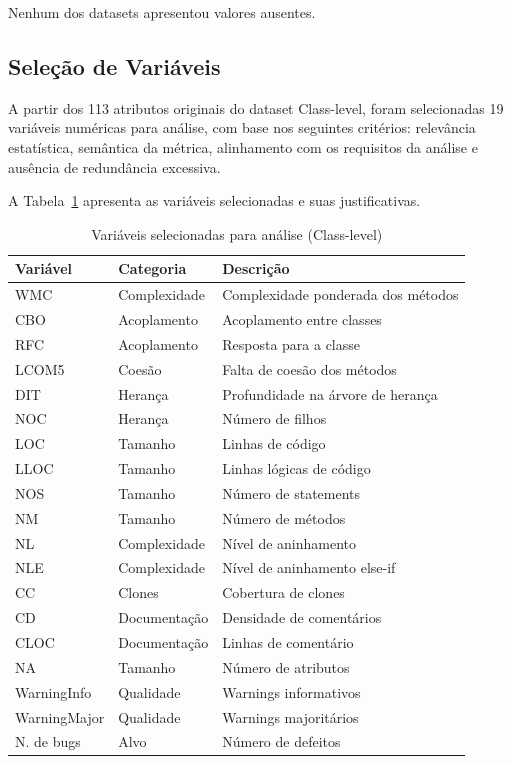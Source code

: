 \documentclass[12pt]{article}
\begin{document}
Nenhum dos datasets apresentou valores ausentes.

\subsection{Seleção de Variáveis}

A partir dos 113 atributos originais do dataset Class-level, foram selecionadas 19 variáveis numéricas para análise, com base nos seguintes critérios: relevância estatística, semântica da métrica, alinhamento com os requisitos da análise e ausência de redundância excessiva.

A Tabela~\ref{tab:selecao} apresenta as variáveis selecionadas e suas justificativas.

\begin{table}[H]
\centering
\caption{Variáveis selecionadas para análise (Class-level)}
\label{tab:selecao}
\small
\begin{tabular}{lll}
\toprule
\textbf{Variável} & \textbf{Categoria} & \textbf{Descrição} \\
\midrule
WMC   & Complexidade & Complexidade ponderada dos métodos \\
CBO   & Acoplamento  & Acoplamento entre classes \\
RFC   & Acoplamento  & Resposta para a classe \\
LCOM5 & Coesão       & Falta de coesão dos métodos \\
DIT   & Herança      & Profundidade na árvore de herança \\
NOC   & Herança      & Número de filhos \\
LOC   & Tamanho      & Linhas de código \\
LLOC  & Tamanho      & Linhas lógicas de código \\
NOS   & Tamanho      & Número de statements \\
NM    & Tamanho      & Número de métodos \\
NL    & Complexidade & Nível de aninhamento \\
NLE   & Complexidade & Nível de aninhamento else-if \\
CC    & Clones       & Cobertura de clones \\
CD    & Documentação & Densidade de comentários \\
CLOC  & Documentação & Linhas de comentário \\
NA    & Tamanho      & Número de atributos \\
WarningInfo  & Qualidade & Warnings informativos \\
WarningMajor & Qualidade & Warnings majoritários \\
N. de bugs   & Alvo      & Número de defeitos \\
\bottomrule
\end{tabular}
\end{table}
\end{document}
